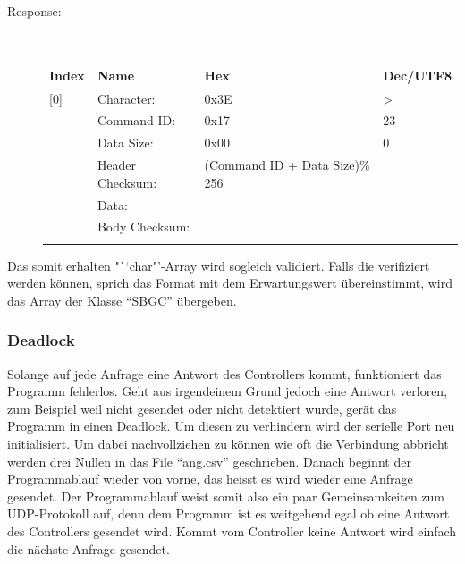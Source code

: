 \documentclass[12pt]{article} %
\begin{document}
	\begin{description}
		\item[Response:]~\par
		\begin{tabular}{llll}
			\textbf{Index} & \textbf{Name} & \textbf{Hex}& \textbf{Dec/UTF8}\\ \toprule[1.5pt]
			[0] &	Character:& 0x3E & >\\ \hline
			[1] & 	Command ID:& 0x17& 23\\ \hline
			[2] &	Data Size:& 0x00& 0\\ \hline
			[3] &	Header Checksum: & (Command ID + Data Size)\% 256\\ \hline
			[4...66] &Data: & & \\ \hline
			[67] & 	Body Checksum: & &\\ \\
		\end{tabular}
	\end{description}
		
	\noindent
	Das somit erhalten "``char"'-Array wird sogleich validiert. Falls die verifiziert werden können, sprich das Format mit dem Erwartungswert übereinstimmt, wird das Array der Klasse "`SBGC"' übergeben.
	
	\subsubsection{Deadlock}
	Solange auf jede Anfrage eine Antwort des Controllers kommt, funktioniert das Programm fehlerlos. Geht aus irgendeinem Grund jedoch eine Antwort verloren, zum Beispiel weil nicht gesendet oder nicht detektiert wurde, gerät das Programm in einen Deadlock. Um diesen zu verhindern wird der serielle Port neu initialisiert. Um dabei nachvollziehen zu können wie oft die Verbindung abbricht werden drei Nullen in das File "`ang.csv"' geschrieben. Danach beginnt der Programmablauf wieder von vorne, das heisst es wird wieder eine Anfrage gesendet. Der Programmablauf weist somit also ein paar Gemeinsamkeiten zum UDP-Protokoll auf, denn dem Programm ist es weitgehend egal ob eine Antwort des Controllers gesendet wird. Kommt vom Controller keine Antwort wird einfach die nächste Anfrage gesendet.  
	
\end{document}
